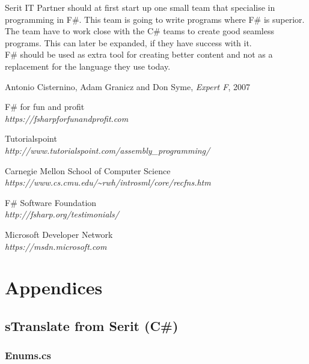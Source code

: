 \documentclass[12pt, a4paper]{article}
\begin{document}
Serit IT Partner should at first start up one small team that specialise in programming in F\#. This team is going to write programs where F\# is superior. The team have to work close with the C\# teams to create good seamless programs. This can later be expanded, if they have success with it.\\

F\# should be used as extra tool for creating better content and not as a replacement for the language they use today. 

\newpage


\begin{thebibliography}{9}

Antonio Cisternino, Adam Granicz and Don Syme,
\textit{Expert F}, 
2007

F\# for fun and profit\\
\emph{https://fsharpforfunandprofit.com}

Tutorialspoint\\
\emph{http://www.tutorialspoint.com/assembly\_programming/}

Carnegie Mellon School of Computer Science\\
\emph{https://www.cs.cmu.edu/\textasciitilde rwh/introsml/core/recfns.htm}

F\# Software Foundation\\
\emph{http://fsharp.org/testimonials/}

Microsoft Developer Network\\
\emph{https://msdn.microsoft.com}


 
\end{thebibliography}
\newpage

\appendix
\footnotesize
\section{Appendices}	
\subsection{sTranslate from Serit (C\#)}
\subsubsection{Enums.cs}

\newpage
\end{document}
